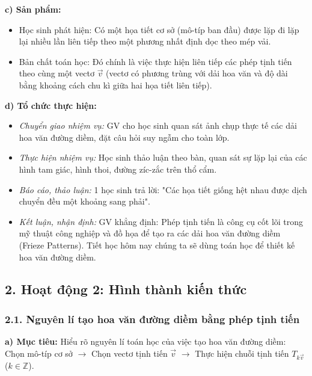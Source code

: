 \documentclass[12pt, a4paper]{article}
\renewcommand{\vec}[1]{\overrightarrow{#1}}
\begin{document}
\noindent \textbf{c) Sản phẩm:}  
\begin{itemize}[leftmargin=0.8cm]  
    \item Học sinh phát hiện: Có một họa tiết cơ sở (mô-típ ban đầu) được lặp đi lặp lại nhiều lần liên tiếp theo một phương nhất định dọc theo mép vải.  
    \item Bản chất toán học: Đó chính là việc thực hiện liên tiếp các phép tịnh tiến theo cùng một vectơ $\vec{v}$ (vectơ có phương trùng với dải hoa văn và độ dài bằng khoảng cách chu kì giữa hai họa tiết liên tiếp).  
\end{itemize}  
  
\noindent \textbf{d) Tổ chức thực hiện:}  
\begin{itemize}[leftmargin=0.8cm]  
    \item \textit{Chuyển giao nhiệm vụ:} GV cho học sinh quan sát ảnh chụp thực tế các dải hoa văn đường diềm, đặt câu hỏi suy ngẫm cho toàn lớp.  
    \item \textit{Thực hiện nhiệm vụ:} Học sinh thảo luận theo bàn, quan sát sự lặp lại của các hình tam giác, hình thoi, đường zíc-zắc trên thổ cẩm.  
    \item \textit{Báo cáo, thảo luận:} 1 học sinh trả lời: "Các họa tiết giống hệt nhau được dịch chuyển đều một khoảng sang phải".  
    \item \textit{Kết luận, nhận định:} GV khẳng định: Phép tịnh tiến là công cụ cốt lõi trong mỹ thuật công nghiệp và đồ họa để tạo ra các dải hoa văn đường diềm (Frieze Patterns). Tiết học hôm nay chúng ta sẽ dùng toán học để thiết kế hoa văn đường diềm.  
\end{itemize}  
  
\subsection*{2. Hoạt động 2: Hình thành kiến thức}  
  
\subsubsection*{2.1. Nguyên lí tạo hoa văn đường diềm bằng phép tịnh tiến}  
  
\noindent \textbf{a) Mục tiêu:}  
Hiểu rõ nguyên lí toán học của việc tạo hoa văn đường diềm: Chọn mô-típ cơ sở $\to$ Chọn vectơ tịnh tiến $\vec{v}$ $\to$ Thực hiện chuỗi tịnh tiến $T_{k\vec{v}}$ ($k \in \mathbb{Z}$).  
  
\end{document}
